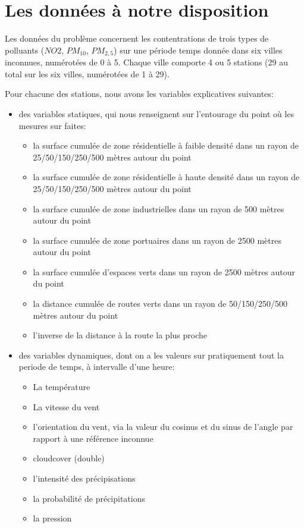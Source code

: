 \section{Les données à notre disposition}

Les données du problème concernent les contentrations de trois types de polluants ($NO2$, $PM_{10}$, $PM_{2,5}$) sur une période temps donnée dans six villes inconnues, numérotées de 0 à 5.
Chaque ville comporte 4 ou 5 stations (29 au total sur les six villes, numérotées de 1 à 29).

Pour chacune des stations, nous avons les variables explicatives suivantes:
\begin{itemize}
  \item des variables statiques, qui nous renseignent sur l'entourage du point où les mesures sur faites:
  \begin{itemize}
    \item la surface cumulée de zone résidentielle à faible densité dans un rayon de 25/50/150/250/500 mètres autour du point
    \item la surface cumulée de zone résidentielle à haute densité dans un rayon de 25/50/150/250/500 mètres autour du point
    \item la surface cumulée de zone industrielles dans un rayon de 500 mètres autour du point
    \item la surface cumulée de zone portuaires dans un rayon de 2500 mètres autour du point
    \item la surface cumulée d'espaces verts dans un rayon de 2500 mètres autour du point
    \item la distance cumulée de routes verts dans un rayon de 50/150/250/500 mètres autour du point
    \item l'inverse de la distance à la route la plus proche
  \end{itemize}
  \item des variables dynamiques, dont on a les valeurs sur pratiquement tout la periode de temps, à intervalle d'une heure:
  \begin{itemize}
    \item La température
    \item La vitesse du vent
    \item l'orientation du vent, via la valeur du cosinus et du sinus de l'angle par rapport à une référence inconnue
    \item cloudcover (double)
    \item l'intensité des précipisations
    \item la probabilité de précipitations
    \item la pression
  \end{itemize}
\end{itemize}

